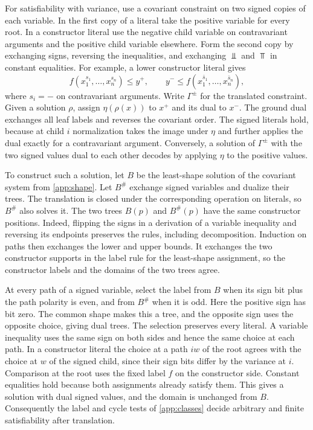 For satisfiability with variance, use a covariant constraint
on two signed copies of each variable. In the first copy of a
literal take the positive variable for every root. In a
constructor literal use the negative child variable on
contravariant arguments and the positive child variable
elsewhere. Form the second copy by exchanging signs, reversing
the inequalities, and exchanging $\Bot$ and $\Top$ in constant
equalities. For example, a lower constructor literal gives
\[
  f(x_1^{s_1},\dots,x_n^{s_n})\le y^+,\qquad
  y^-\le f(x_1^{\bar s_1},\dots,x_n^{\bar s_n}),
\]
where $s_i=-$ on contravariant arguments. Write $\Gamma^\pm$
for the translated constraint. Given a solution $\rho$,
assign $\eta(\rho(x))$ to $x^+$ and its dual to $x^-$.
The ground dual exchanges all leaf labels and reverses the
covariant order. The signed literals hold, because at child $i$
normalization takes the image under $\eta$ and further applies
the dual exactly for a contravariant argument. Conversely,
a solution of $\Gamma^\pm$ with the two signed values dual to
each other decodes by applying $\eta$ to the positive values.

To construct such a solution, let $B$ be the least-shape solution
of the covariant system from \cref{app:shape}. Let $B^\#$ exchange
signed variables and dualize their trees. The translation is
closed under the corresponding operation on literals, so
$B^\#$ also solves it. The two trees $B(p)$ and $B^\#(p)$
have the same constructor positions. Indeed, flipping the
signs in a derivation of a variable inequality and reversing
its endpoints preserves the rules, including decomposition.
Induction on paths then exchanges the lower and upper bounds.
It exchanges the two constructor supports in the label rule
for the least-shape assignment, so the constructor labels
and the domains of the two trees agree.

At every path of a signed variable, select the label from
$B$ when its sign bit plus the path polarity is even, and
from $B^\#$ when it is odd. Here the positive sign has bit
zero. The common shape makes this a tree, and the opposite
sign uses the opposite choice, giving dual trees. The
selection preserves every literal. A variable inequality
uses the same sign on both sides and hence the same choice
at each path. In a constructor literal the choice at a path
$iw$ of the root agrees with the choice at $w$ of the signed
child, since their sign bits differ by the variance at $i$.
Comparison at the root uses the fixed label $f$ on the
constructor side. Constant equalities hold because both
assignments already satisfy them. This gives a solution
with dual signed values, and the domain is unchanged from
$B$. Consequently the label and cycle tests of
\cref{app:classes} decide arbitrary and finite
satisfiability after translation.

